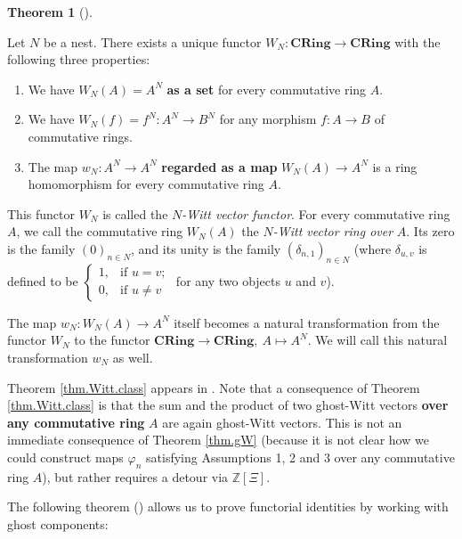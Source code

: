 \documentclass[numbers=enddot,12pt,final,onecolumn,notitlepage]{scrartcl}%
\theoremstyle{definition}
\newtheorem{theo}{Theorem}[section]
\newenvironment{theorem}[1][]
{\begin{theo}[#1]\begin{leftbar}}
{\end{leftbar}\end{theo}}
\begin{document}
\begin{theorem}
\label{thm.Witt.class}Let $N$ be a nest. There exists a unique functor
$W_{N}:\mathbf{CRing}\rightarrow\mathbf{CRing}$ with the following three properties:

\begin{enumerate}
\item We have $W_{N}\left(  A\right)  =A^{N}$ \textbf{as a set} for every
commutative ring $A$.

\item We have $W_{N}\left(  f\right)  =f^{N}:A^{N}\rightarrow B^{N}$ for any
morphism $f:A\rightarrow B$ of commutative rings.

\item The map $w_{N}:A^{N}\rightarrow A^{N}$ \textbf{regarded as a map }%
$W_{N}\left(  A\right)  \rightarrow A^{N}$ is a ring homomorphism for every
commutative ring $A$.
\end{enumerate}

This functor $W_{N}$ is called the $N$\textit{-Witt vector functor}. For every
commutative ring $A$, we call the commutative ring $W_{N}\left(  A\right)  $
the $N$\textit{-Witt vector ring over }$A$. Its zero is the family $\left(
0\right)  _{n\in N}$, and its unity is the family $\left(  \delta
_{n,1}\right)  _{n\in N}$ (where $\delta_{u,v}$ is defined to be $%
\begin{cases}
1, & \text{if }u=v;\\
0, & \text{if }u\neq v
\end{cases}
$ for any two objects $u$ and $v$).

The map $w_{N}:W_{N}\left(  A\right)  \rightarrow A^{N}$ itself becomes a
natural transformation from the functor $W_{N}$ to the functor $\mathbf{CRing}%
\rightarrow\mathbf{CRing},\ A\mapsto A^{N}$. We will call this natural
transformation $w_{N}$ as well.
\end{theorem}

Theorem \ref{thm.Witt.class} appears in \cite[Theorem 2.6]{rabinoff-witt}.
Note that a consequence of Theorem \ref{thm.Witt.class} is that the sum and
the product of two ghost-Witt vectors \textbf{over any commutative ring }$A$
are again ghost-Witt vectors. This is not an immediate consequence of Theorem
\ref{thm.gW} (because it is not clear how we could construct maps $\varphi
_{n}$ satisfying Assumptions 1, 2 and 3 over any commutative ring $A$), but
rather requires a detour via $\mathbb{Z}\left[  \Xi\right]  $.

The following theorem (\cite[Remark 2.9, part 3]{rabinoff-witt}) allows us to
prove functorial identities by working with ghost components:
\end{document}
